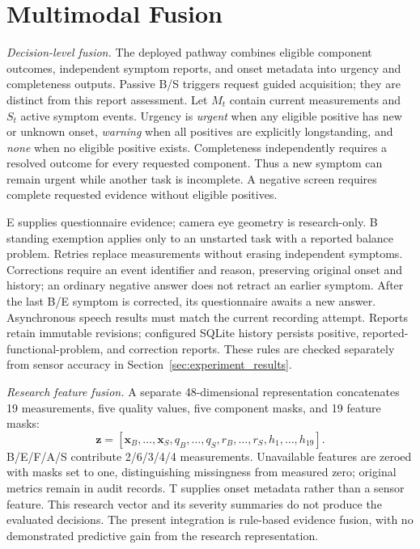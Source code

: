 \section{Multimodal Fusion}
\label{sec:fusion}
\textit{Decision-level fusion.}
The deployed pathway combines eligible component outcomes, independent symptom
reports, and onset metadata into urgency and completeness outputs.
Passive B/S triggers request guided acquisition; they are distinct from this
report assessment. Let $M_t$ contain current measurements and $S_t$ active
symptom events. Urgency is \textit{urgent} when any eligible positive has new
or unknown onset, \textit{warning} when all positives are explicitly longstanding,
and \textit{none} when no eligible positive exists.
Completeness independently requires a resolved outcome for every requested
component. Thus a new symptom can remain urgent while another task is incomplete.
A negative screen requires complete requested evidence without eligible positives.

E supplies questionnaire evidence; camera eye geometry is research-only.
B standing exemption applies only to an unstarted task with a reported balance
problem. Retries replace measurements without erasing independent symptoms.
Corrections require an event identifier and reason, preserving original onset
and history; an ordinary negative answer does not retract an earlier symptom.
After the last B/E symptom is corrected, its questionnaire awaits a new answer.
Asynchronous speech results must match the current recording attempt.
Reports retain immutable revisions; configured SQLite history persists positive,
reported-functional-problem, and correction reports. These rules are checked
separately from sensor accuracy in Section~\ref{sec:experiment_results}.

\textit{Research feature fusion.}
A separate 48-dimensional representation concatenates 19 measurements, five
quality values, five component masks, and 19 feature masks:
\begin{equation}
\mathbf z=[\mathbf x_B,\ldots,\mathbf x_S,
q_B,\ldots,q_S,r_B,\ldots,r_S,h_1,\ldots,h_{19}].
\end{equation}
B/E/F/A/S contribute 2/6/3/4/4 measurements. Unavailable features are zeroed
with masks set to one, distinguishing missingness from measured zero;
original metrics remain in audit records. T supplies onset metadata rather
than a sensor feature. This research vector and its severity summaries do not
produce the evaluated decisions. The present integration is rule-based evidence
fusion, with no demonstrated predictive gain from the research representation.
